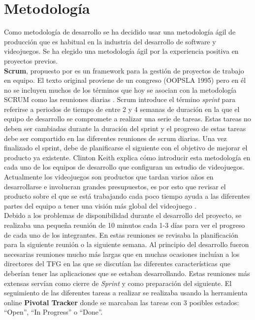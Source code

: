 \section{Metodolog\'ia}

Como metodolog\'ia de desarrollo se ha decidido usar una metodolog\'ia \'agil de producci\'on que es habitual en la industria del desarrollo de software y videojuegos. Se ha elegido una metodolog\'ia \'agil por la experiencia positiva en proyectos previos.\\

\textbf{Scrum}, propuesto por \cite{scrum} es un framework para la gesti\'on de proyectos de trabajo en equipo. El texto original proviene de un congreso (OOPSLA 1995) pero en \'el no se incluyen muchos de los t\'erminos que hoy se asocian con la metodolog\'ia SCRUM como las reuniones diarias \citep{scrum2}. Scrum introduce el t\'ermino \textit{sprint} para referirse a periodos de tiempo de entre 2 y 4 semanas de duraci\'on en la que el equipo de desarrollo se compromete a realizar una serie de tareas. Estas tareas no deben ser cambiadas durante la duraci\'on del sprint y el progreso de estas tareas debe ser compartido en las diferentes reuniones de scrum diarias. Una vez finalizado el sprint, debe de planificarse el siguiente con el objetivo de mejorar el producto ya existente. Clinton Keith explica c\'omo introducir esta metodolog\'ia en cada uno de los equipos de desarrollo que configuran un estudio de videojuegos. Actualmente los videojuegos son productos que tardan varios a\~nos en desarrollarse e involucran grandes presupuestos, es por esto que revisar el producto sobre el que se est\'a trabajando cada poco tiempo ayuda a las diferentes partes del equipo a tener una visi\'on m\'as global del videojuego \citep{keith2010agile}.  \\

Debido a los problemas de disponibilidad durante el desarrollo del proyecto, se realizaba una peque\~na reuni\'on de 10 minutos cada 1-3 d\'ias para ver el progreso de cada uno de los integrantes. En estas reuniones se revisaba la planificaci\'on para la siguiente reuni\'on o la siguiente semana. Al principio del desarrollo fueron necesarias reuniones mucho m\'as largas que en muchas ocasiones inclu\'ian a los directores del TFG en las que se discut\'ian las diferentes caracter\'isticas que deber\'ian tener las aplicaciones que se estaban desarrollando. Estas reuniones m\'as extensas serv\'ian como cierre de \textit{Sprint} y como preparaci\'on del siguiente. El seguimiento de las diferentes tareas a realizar se realizaba usando la herramienta online \textbf{Pivotal Tracker} donde se marcaban las tareas con 3 posibles estados: ``Open'', ``In Progress'' o ``Done''.


